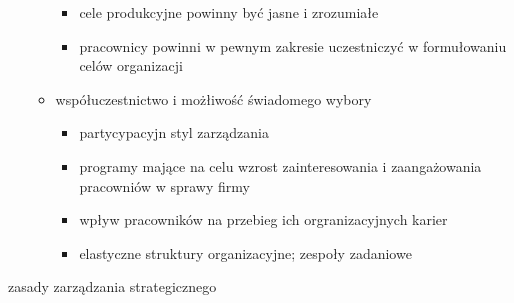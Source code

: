 \documentclass[a4paper,10pt]{report}
\begin{document}
\begin{itemize}
\begin{itemize}
		\begin{itemize}
			\item cele produkcyjne powinny być jasne i zrozumiałe
			\item pracownicy powinni w pewnym zakresie uczestniczyć w formułowaniu celów organizacji
		\end{itemize}
		\item współuczestnictwo i możłiwość świadomego wybory
		\begin{itemize}
			\item partycypacyjn styl zarządzania
			\item programy mające na celu wzrost zainteresowania i zaangażowania pracowniów w sprawy firmy
			\item wpływ pracowników na przebieg ich orgranizacyjnych karier
			\item elastyczne struktury organizacyjne; zespoły zadaniowe
		\end{itemize}
	\end{itemize}
\end{itemize}

zasady zarządzania strategicznego
\end{document}
